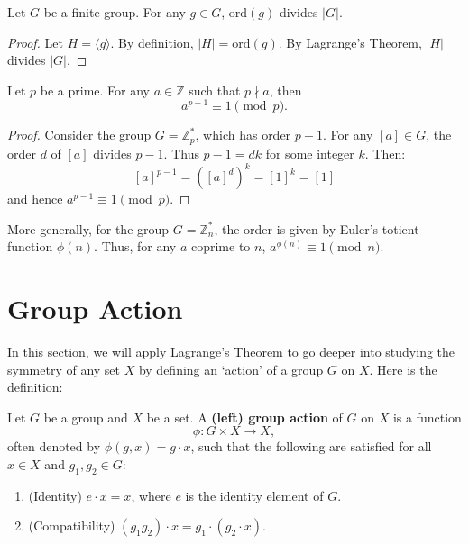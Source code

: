 \begin{corollary}
Let $G$ be a finite group. For any $g \in G$, $\mathrm{ord}(g)$ divides $|G|$.
\end{corollary}
\begin{proof}
Let $H = \langle g \rangle$. By definition, $|H| = \mathrm{ord}(g)$. By Lagrange's Theorem, $|H|$ divides $|G|$.
\end{proof}

\begin{example}
Let $p$ be a prime. For any $a \in \mathbb{Z}$ such that $p \nmid a$, then 
$$a^{p-1} \equiv 1 \pmod p.$$
\end{example}
\begin{proof}
Consider the group $G = \mathbb{Z}_p^*$, which has order $p-1$. For any $[a] \in G$, the order $d$ of $[a]$ divides $p-1$. Thus $p-1 = dk$ for some integer $k$. Then:
$$[a]^{p-1} = ([a]^d)^k = [1]^k = [1]$$
and hence $a^{p-1} \equiv 1 \pmod p$.
\end{proof}

\begin{remark}
More generally, for the group $G = \mathbb{Z}_n^*$, the order is given by Euler's totient function $\phi(n)$. Thus, for any $a$ coprime to $n$, $a^{\phi(n)} \equiv 1 \pmod n$.
\end{remark}




\section{Group Action}
In this section, we will apply Lagrange's Theorem to go deeper into studying the symmetry of any set $X$ by defining an `action' of a group $G$ on $X$. Here is the definition:
\begin{definition}
Let $G$ be a group and $X$ be a set. A \textbf{(left) group action} of $G$ on $X$ is a function 
$$\phi: G \times X \to X,$$ 
often denoted by $\phi(g, x) = g \cdot x$, such that the following are satisfied for all $x \in X$ and $g_1, g_2 \in G$:
\begin{enumerate}
    \item (Identity) $e \cdot x = x$, where $e$ is the identity element of $G$.
    \item (Compatibility) $(g_1 g_2) \cdot x = g_1 \cdot (g_2 \cdot x)$.
\end{enumerate}    
\end{definition}

